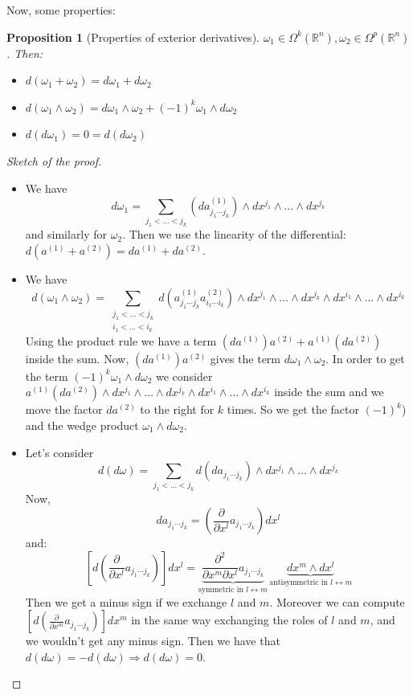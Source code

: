 \documentclass[a4paper,11pt,titlepage, article, oneside]{memoir}
\numberwithin{equation}{section}
\newtheorem{proposition}[theorem]{Proposition}
\theoremstyle{definition}
\theoremstyle{remark}
\newcommand{\rfield}{\mathbb{R}}
\begin{document}
Now, some properties:
\begin{proposition}[Properties of exterior derivatives]
  $\omega_1 \in \Omega^k(\rfield^n), \omega_2 \in \Omega^p(\rfield^n)$. Then:
  \begin{itemize}
    \item $d(\omega_1 +\omega_2) = d\omega_1 + d\omega_2$
    \item $d(\omega_1 \wedge \omega_2) = d\omega_1 \wedge \omega_2 + (-1)^k \omega_1 \wedge d\omega_2$
    \item $d(d\omega_1)  = 0 = d(d\omega_2)$
  \end{itemize}
\end{proposition}
\begin{proof}[Sketch of the proof]
$ $
	\begin{itemize}
	\item We have 
	$$d \omega_1 = \sum\limits_{j_1 < \ldots < j_k} \left (d a^{(1)}_{j_1 \cdots j_k} \right) \wedge dx^{j_1} \wedge \ldots \wedge dx^{j_k}$$
	and similarly for $\omega_2$. Then we use the linearity of the differential: $d(a^{(1)} + a^{(2)}) = da^{(1)} + da^{(2)}$.
	\item We have
	$$d(\omega_1 \wedge \omega_2) = \sum\limits_{\substack{j_1 < \ldots < j_k \\ i_1 < \ldots < i_k}} d \left (a^{(1)}_{j_1 \cdots j_k} a^{(2)}_{i_1 \cdots i_k} \right) \wedge dx^{j_1} \wedge \ldots \wedge dx^{j_k} \wedge dx^{i_1} \wedge \ldots \wedge dx^{i_k}$$
	Using the product rule we have a term $\left ( da^{(1)} \right ) a^{(2)} + a^{(1)} \left(da^{(2)}\right)$ inside the sum. Now, $\left( da^{(1)} \right) a^{(2)}$ gives the term $d \omega_1 \wedge \omega_2$. In order to get the term $(-1)^k \omega_1 \wedge d \omega_2$ we consider $a^{(1)}\left(da^{(2)} \right) \wedge dx^{j_1} \wedge \ldots \wedge dx^{j_k} \wedge dx^{i_1} \wedge \ldots \wedge dx^{i_k}$ inside the sum and we move the factor $da^{(2)}$ to the right for $k$ times. So we get the factor $(-1)^k$) and the wedge product $\omega_1 \wedge d \omega_2$.
	\item Let's consider
	$$d(d \omega) = \sum\limits_{j_1 < \ldots < j_k} d \left (da_{j_1 \cdots j_k} \right) \wedge dx^{j_1} \wedge \ldots \wedge dx^{j_k}$$
	Now, 
	$$da_{j_1 \cdots j_k} = \left(\frac{\partial}{\partial x^l} a_{j_1 \cdots j_k} \right)dx^l$$
	and:
	$$\left[d \left( \frac{\partial}{\partial x^l} a_{j_1 \cdots j_k}\right) \right] dx^l = \underbrace{\frac{\partial^2}{\partial x^m \partial x^l} a_{j_1 \cdots j_k}}_{\text{symmetric in } l \leftrightarrow m} \, \underbrace{dx^m \wedge dx^l}_{\text{antisymmetric in } l \leftrightarrow m}$$
	Then we get a minus sign if we exchange $l$ and $m$. Moreover we can compute  $\left[d \left( \frac{\partial}{\partial x^m} a_{j_1 \cdots j_k}\right) \right] dx^m$ in the same way exchanging the roles of $l$ and $m$, and we wouldn't get any minus sign. Then we have that $d(d \omega) = -d (d \omega) \Rightarrow d(d \omega) = 0$.
	\end{itemize}
\end{proof}
\end{document}
